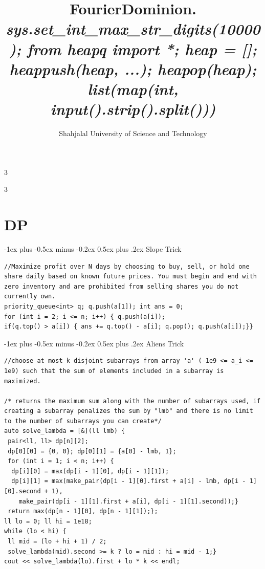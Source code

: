 \documentclass[8pt,a4paper,onesided]{article}
\makeatletter
\renewcommand{\subsection}{\@startsection{subsection}{2}{0mm}
    {-1ex plus -0.5ex minus -0.2ex} %
    {0.5ex plus .2ex}                %
    {\normalfont\large\bfseries}}    %
\makeatother
\begin{document}
\title{\vspace{-1.5cm}FourierDominion. \\ \large \textit{sys.set\_int\_max\_str\_digits(10000); from heapq import *; heap = []; heappush(heap, ...); heapop(heap); } \\ \large \textit{list(map(int, input().strip().split()))} }
\author{Shahjalal University of Science and Technology}
\date{}
\maketitle
\begin{multicols}{3}
\tableofcontents
\end{multicols}
\vspace{0.5cm}
\begin{multicols}{3}
\section{DP}
\subsection{Slope Trick}
\begin{verbatim}
//Maximize profit over N days by choosing to buy, sell, or hold one share daily based on known future prices. You must begin and end with zero inventory and are prohibited from selling shares you do not currently own.
priority_queue<int> q; q.push(a[1]); int ans = 0;
for (int i = 2; i <= n; i++) { q.push(a[i]);
if(q.top() > a[i]) { ans += q.top() - a[i]; q.pop(); q.push(a[i]);}}
\end{verbatim}
\subsection{Aliens Trick}
\begin{verbatim}
//choose at most k disjoint subarrays from array 'a' (-1e9 <= a_i <= 1e9) such that the sum of elements included in a subarray is maximized.

/* returns the maximum sum along with the number of subarrays used, if creating a subarray penalizes the sum by "lmb" and there is no limit to the number of subarrays you can create*/
auto solve_lambda = [&](ll lmb) {
 pair<ll, ll> dp[n][2];
 dp[0][0] = {0, 0}; dp[0][1] = {a[0] - lmb, 1};
 for (int i = 1; i < n; i++) {
  dp[i][0] = max(dp[i - 1][0], dp[i - 1][1]);
  dp[i][1] = max(make_pair(dp[i - 1][0].first + a[i] - lmb, dp[i - 1][0].second + 1),
    make_pair(dp[i - 1][1].first + a[i], dp[i - 1][1].second));}
 return max(dp[n - 1][0], dp[n - 1][1]);};
ll lo = 0; ll hi = 1e18;
while (lo < hi) {
 ll mid = (lo + hi + 1) / 2;
 solve_lambda(mid).second >= k ? lo = mid : hi = mid - 1;}
cout << solve_lambda(lo).first + lo * k << endl;
\end{verbatim}

\end{multicols}
\end{document}
